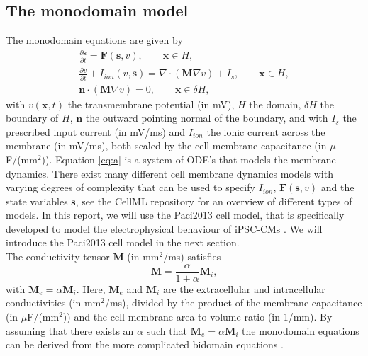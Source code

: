 \documentclass{article}
\begin{document}
\subsection{The monodomain model} \label{The monodomain model}
The monodomain equations are given by 
\begin{eqnarray} \label{eq:a}
\frac{\partial \mathbf{s}}{\partial t}= \mathbf{F}(\mathbf{s},v), \qquad \mathbf{x} \in H, \\
\frac{\partial v}{\partial t} + I_{ion}(v,\mathbf{s}) =\nabla \label{eq:b} \cdot(\mathbf{M}\nabla v) + I_s,\qquad \mathbf{x} \in H, \\ \label{eq:c}
\mathbf{n}\cdot (\mathbf{M}\nabla v)=0, \qquad \mathbf{x} \in \delta H,
\end{eqnarray}
with $v(\mathbf{x},t)$ the transmembrane potential (in mV), $H$ the domain, $\delta H$ the boundary of $H$, $\mathbf{n}$ the outward pointing normal of the boundary, and with $I_s$ the prescribed input current (in mV/ms) and $I_{ion}$ the ionic current across the membrane (in mV/ms), both scaled by the cell membrane capacitance (in $\mu$F/(mm$^2$)). 
Equation \eqref{eq:a} is a system of ODE's that models the membrane dynamics. There exist many different cell membrane dynamics models with varying degrees of complexity that can be used to specify $I_{ion}$, $\mathbf{F}(\mathbf{s},v)$ and the state variables $\mathbf{s}$, see the CellML repository \cite{cellml} for an overview of different types of models. In this report, we will use the Paci2013 cell model, that is specifically developed to model the electrophysical behaviour of iPSC-CMs \cite{Paci2013}. We will introduce the Paci2013 cell model in the next section.\\ The conductivity tensor $\mathbf{M}$ (in mm$^2$/ms) satisfies 
\begin{equation}
\mathbf{M}=\frac{\alpha}{1+\alpha}\mathbf{M}_i,\label{eq:d}
\end{equation}
with $\mathbf{M}_e=\alpha \mathbf{M}_i$. Here, $\mathbf{M}_e$ and $\mathbf{M}_i$ are the extracellular and intracellular conductivities (in mm$^2$/ms), divided by the product of the membrane capacitance (in $\mu$F/(mm$^2$)) and the cell membrane area-to-volume ratio (in 1/mm). By assuming that there exists an $\alpha$ such that $\mathbf{M}_e=\alpha \mathbf{M}_i$ the monodomain equations can be derived from the more complicated bidomain equations \cite[p. 566-568]{KeenerII}.
%
\end{document}
